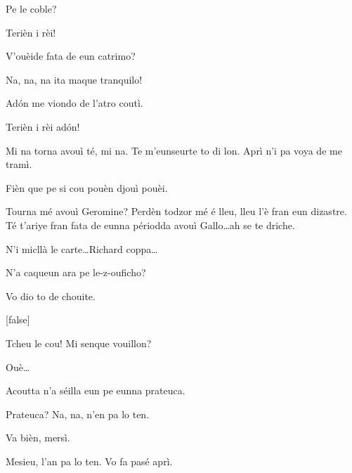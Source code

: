 \begin{drama}
\Gerominespeaks Pe le coble?

\Tuenospeaks Terièn i rèi!

\Spritzspeaks{} V'ouèide fata de eun catrimo?

\Tcheuttespeaks Na, na, na ita maque tranquilo!

\Spritzspeaks Ad\'on me viondo de l'atro coutì.


\Tuenospeaks Terièn i rèi ad\'on!


\Gerominespeaks Mi na torna avouì té, mi na. Te m'eunseurte to di lon. Aprì n'i pa voya de me tramì.

\Saventaspeaks Fièn que pe si cou pouèn djouì pouèi.

\Richardspeaks Tourna mé avouì Geromine? Perdèn todzor mé é lleu, lleu l'è fran eun dizastre.  Té t'ariye fran fata de eunna périodda avouì Gallo\ldots ah se te driche.

\Tuenospeaks N'i micllà le carte\ldots Richard coppa\ldots





\Genespeaks{} N'a caqueun ara pe le-z-ouficho?

\Sandrinospeaks Vo dio to de chouite.


[false]

\Tuenospeaks Tcheu le cou! Mi senque vouillon?


\Tuenospeaks Ouè\ldots

\Sandrinospeaks Acoutta n'a séilla eun pe eunna prateuca.

\Tuenospeaks Prateuca? Na, na, n'en pa lo ten.

\Sandrinospeaks Va bièn, mersì.


\Sandrinospeaks{} Mesieu, l'an pa lo ten. Vo fa pasé aprì.


\end{drama}
